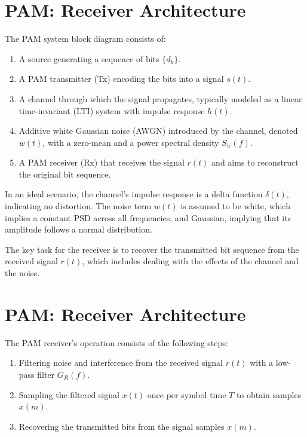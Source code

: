 \section*{PAM: Receiver Architecture}

The PAM system block diagram consists of:
\begin{enumerate}
    \item A source generating a sequence of bits \( \{d_k\} \).
    \item A PAM transmitter (Tx) encoding the bits into a signal \( s(t) \).
    \item A channel through which the signal propagates, typically modeled as a linear time-invariant (LTI) system with impulse response \( h(t) \).
    \item Additive white Gaussian noise (AWGN) introduced by the channel, denoted \( w(t) \), with a zero-mean and a power spectral density \( S_w(f) \).
    \item A PAM receiver (Rx) that receives the signal \( r(t) \) and aims to reconstruct the original bit sequence.
\end{enumerate}

In an ideal scenario, the channel's impulse response is a delta function \( \delta(t) \), indicating no distortion. The noise term \( w(t) \) is assumed to be white, which implies a constant PSD across all frequencies, and Gaussian, implying that its amplitude follows a normal distribution.

The key task for the receiver is to recover the transmitted bit sequence from the received signal \( r(t) \), which includes dealing with the effects of the channel and the noise.


\section*{PAM: Receiver Architecture}

The PAM receiver's operation consists of the following steps:
\begin{enumerate}
    \item Filtering noise and interference from the received signal \( r(t) \) with a low-pass filter \( G_R(f) \).
    \item Sampling the filtered signal \( x(t) \) once per symbol time \( T \) to obtain samples \( x(m) \).
    \item Recovering the transmitted bits from the signal samples \( x(m) \).
\end{enumerate}

